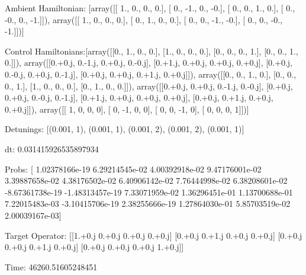 \documentclass{article}
\begin{document}
    

\newpage

Ambient Hamiltonian: [array([[ 1.,  0.,  0.,  0.],
       [ 0., -1.,  0., -0.],
       [ 0.,  0.,  1.,  0.],
       [ 0., -0.,  0., -1.]]), array([[ 1.,  0.,  0.,  0.],
       [ 0.,  1.,  0.,  0.],
       [ 0.,  0., -1., -0.],
       [ 0.,  0., -0., -1.]])]

Control Hamiltonians:[array([[0., 1., 0., 0.],
       [1., 0., 0., 0.],
       [0., 0., 0., 1.],
       [0., 0., 1., 0.]]), array([[0.+0.j, 0.-1.j, 0.+0.j, 0.-0.j],
       [0.+1.j, 0.+0.j, 0.+0.j, 0.+0.j],
       [0.+0.j, 0.-0.j, 0.+0.j, 0.-1.j],
       [0.+0.j, 0.+0.j, 0.+1.j, 0.+0.j]]), array([[0., 0., 1., 0.],
       [0., 0., 0., 1.],
       [1., 0., 0., 0.],
       [0., 1., 0., 0.]]), array([[0.+0.j, 0.+0.j, 0.-1.j, 0.-0.j],
       [0.+0.j, 0.+0.j, 0.-0.j, 0.-1.j],
       [0.+1.j, 0.+0.j, 0.+0.j, 0.+0.j],
       [0.+0.j, 0.+1.j, 0.+0.j, 0.+0.j]]), array([[ 1,  0,  0,  0],
       [ 0, -1,  0,  0],
       [ 0,  0, -1,  0],
       [ 0,  0,  0,  1]])]

Detunings: [(0.001, 1), (0.001, 1), (0.001, 2), (0.001, 2), (0.001, 1)]

 dt: 0.031415926535897934

Probs: [ 1.02378166e-19  6.29214545e-02  4.00392918e-02  9.47176001e-02
  3.39887658e-02  4.38176502e-02  6.40906142e-02  7.76444998e-02
  6.38208601e-02 -8.67361738e-19 -1.48313457e-19  7.33071959e-02
  1.36296451e-01  1.13700688e-01  7.22015483e-03 -3.10415706e-19
  2.38255666e-19  1.27864030e-01  5.85703519e-02  2.00039167e-03]

Target Operator: [[1.+0.j 0.+0.j 0.+0.j 0.+0.j]
 [0.+0.j 0.+1.j 0.+0.j 0.+0.j]
 [0.+0.j 0.+0.j 0.+1.j 0.+0.j]
 [0.+0.j 0.+0.j 0.+0.j 1.+0.j]]

Time: 46260.51605248451
\end{document}
